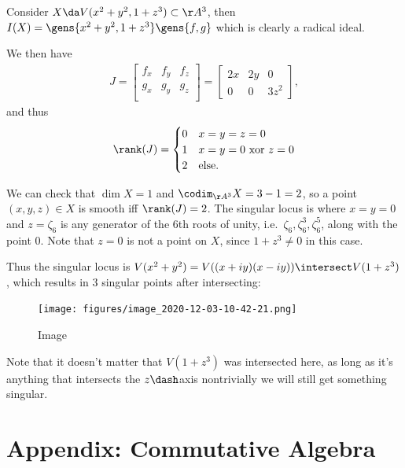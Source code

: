 \begin{example}[?]

Consider \(X\da V(x^2 + y^2, 1+z^3) \subset\AA^3\), then
\(I(X) = \gens{x^2 + y^2, 1 + z^3} \gens{f, g}\) which is clearly a
radical ideal.

We then have
\begin{align*}  
J = 
\begin{bmatrix}
f_x & f_y & f_z \\
g_x & g_y & g_z \\
\end{bmatrix}
=
\begin{bmatrix}
2x & 2y & 0 \\
0 & 0 & 3z^2
\end{bmatrix}
,\end{align*} and thus
\begin{align*}  
\rank(J) = 
\begin{cases}
0 & x=y=z=0 \\
1 & x=y=0 \text{ xor } z=0 \\
2 & \text{else}.
\end{cases}
\end{align*}

We can check that \(\dim X = 1\) and \(\codim_{\AA^3} X = 3-1 = 2\), so
a point \((x,y,z) \in X\) is smooth iff \(\rank(J) = 2\). The singular
locus is where \(x=y=0\) and \(z= \zeta_6\) is any generator of the 6th
roots of unity, i.e.~\(\zeta_6, \zeta_6^3, \zeta_6^5\), along with the
point \(0\). Note that \(z=0\) is not a point on \(X\), since
\(1+z^3\neq 0\) in this case.

Thus the singular locus is
\(V(x^2 + y^2) = V((x+iy)(x-iy)) \intersect V(1+z^3)\), which results in
3 singular points after intersecting:

\begin{figure}
\centering
\texttt{[image: figures/image\_2020-12-03-10-42-21.png]}
\caption{Image}
\end{figure}

Note that it doesn't matter that \(V(1+z^3)\) was intersected here, as
long as it's anything that intersects the \(z\dash\)axis nontrivially we
will still get something singular.

\end{example}

\hypertarget{appendix-commutative-algebra}{%
\section*{Appendix: Commutative
Algebra}\label{appendix-commutative-algebra}}

